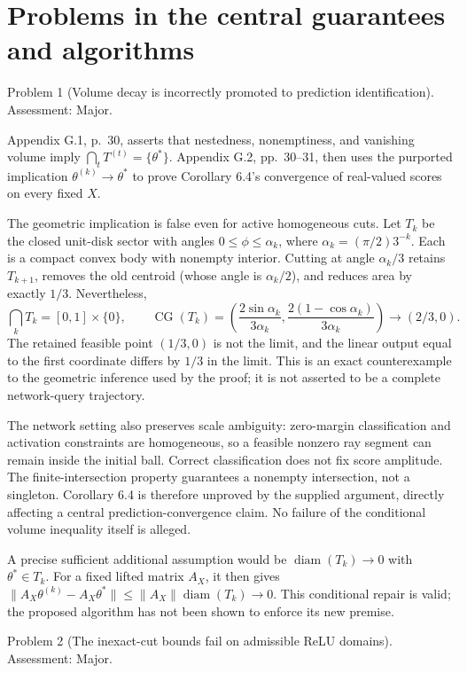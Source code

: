 \documentclass[10pt]{article}
\begin{document}
\section*{Problems in the central guarantees and algorithms}
Problem 1 (Volume decay is incorrectly promoted to prediction identification).  Assessment: Major.\par
Appendix G.1, p. 30, asserts that nestedness, nonemptiness, and vanishing volume imply \(\bigcap_tT^{(t)}=\{\theta^*\}\). Appendix G.2, pp. 30–31, then uses the purported implication \(\theta^{(k)}\to\theta^*\) to prove Corollary 6.4’s convergence of real-valued scores on every fixed \(X\).\par
The geometric implication is false even for active homogeneous cuts. Let \(T_k\) be the closed unit-disk sector with angles \(0\le\phi\le\alpha_k\), where \(\alpha_k=(\pi/2)3^{-k}\). Each is a compact convex body with nonempty interior. Cutting at angle \(\alpha_k/3\) retains \(T_{k+1}\), removes the old centroid (whose angle is \(\alpha_k/2\)), and reduces area by exactly \(1/3\). Nevertheless, \[\bigcap_kT_k=[0,1]\times\{0\},\qquad
 \operatorname{CG}(T_k)=
 \left(\frac{2\sin\alpha_k}{3\alpha_k},
       \frac{2(1-\cos\alpha_k)}{3\alpha_k}\right)
 \longrightarrow(2/3,0).\] The retained feasible point \((1/3,0)\) is not the limit, and the linear output equal to the first coordinate differs by \(1/3\) in the limit. This is an exact counterexample to the geometric inference used by the proof; it is not asserted to be a complete network-query trajectory.\par
The network setting also preserves scale ambiguity: zero-margin classification and activation constraints are homogeneous, so a feasible nonzero ray segment can remain inside the initial ball. Correct classification does not fix score amplitude. The finite-intersection property guarantees a nonempty intersection, not a singleton. Corollary 6.4 is therefore unproved by the supplied argument, directly affecting a central prediction-convergence claim. No failure of the conditional volume inequality itself is alleged.\par
A precise sufficient additional assumption would be \(\operatorname{diam}(T_k)\to0\) with \(\theta^*\in T_k\). For a fixed lifted matrix \(A_X\), it then gives \(\|A_X\theta^{(k)}-A_X\theta^*\|\le
\|A_X\|\operatorname{diam}(T_k)\to0\). This conditional repair is valid; the proposed algorithm has not been shown to enforce its new premise.\par
Problem 2 (The inexact-cut bounds fail on admissible ReLU domains).  Assessment: Major.\par
\end{document}

